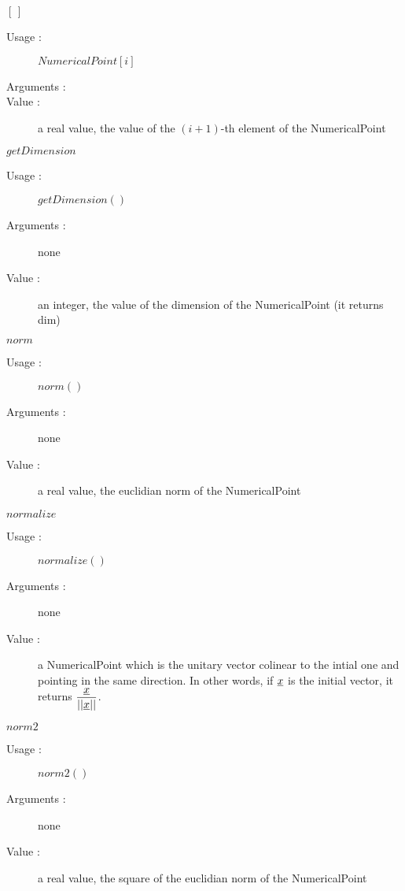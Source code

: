 \begin{description}
\begin{description}
  \item $[\,]$
    \begin{description}
    \item[Usage :] $NumericalPoint[i]$
    \item[Arguments :] \rule{0pt}{1em}
    \item[Value :] a real value, the value of the $(i+1)$-th element of the NumericalPoint
    \end{description}
    \bigskip

  \item $getDimension$
    \begin{description}
    \item[Usage :] $getDimension()$
    \item[Arguments :] none
    \item[Value :] an integer, the value of the dimension of the NumericalPoint  (it returns dim)
    \end{description}
    \bigskip

  \item $norm$
    \begin{description}
    \item[Usage :] $norm()$
    \item[Arguments :] none
    \item[Value :] a real value, the euclidian norm of the NumericalPoint
    \end{description}
    \bigskip

  \item $normalize$
    \begin{description}
    \item[Usage :] $normalize()$
    \item[Arguments :] none
    \item[Value :] a NumericalPoint which is the unitary vector colinear to the intial one and pointing in the same direction. In other words, if ${\underline{x}}$ is the initial vector, it returns $\displaystyle \frac{{\underline{x}}}{||{\underline{x}}||}$.
    \end{description}
    \bigskip

  \item $norm2$
    \begin{description}
    \item[Usage :] $norm2()$
    \item[Arguments :] none
    \item[Value :] a real value, the square of the euclidian norm of the NumericalPoint
    \end{description}
    \bigskip


\end{description}
\end{description}
